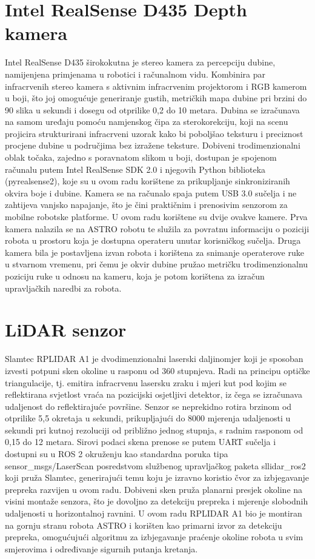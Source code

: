 \documentclass[12pt,a4paper,oneside]{report}
\begin{document}
\section{Intel RealSense D435 Depth kamera}
Intel RealSense D435 širokokutna je stereo kamera za percepciju dubine, namijenjena primjenama u robotici 
i računalnom vidu. Kombinira par infracrvenih stereo kamera s aktivnim infracrvenim projektorom i RGB kamerom 
u boji, što joj omogućuje generiranje gustih, metričkih mapa dubine pri brzini do 90 slika u sekundi i 
dosegu od otprilike 0,2 do 10 metara. Dubina se izračunava na samom uređaju pomoću namjenskog čipa za 
sterokorekciju, koji na scenu projicira strukturirani infracrveni uzorak kako bi poboljšao teksturu i 
preciznost procjene dubine u područjima bez izražene teksture. Dobiveni trodimenzionalni oblak točaka, 
zajedno s poravnatom slikom u boji, dostupan je spojenom računalu putem Intel RealSense SDK 2.0 i 
njegovih Python biblioteka (pyrealsense2), koje su u ovom radu korištene za prikupljanje sinkroniziranih 
okvira boje i dubine. Kamera se na računalo spaja putem USB 3.0 sučelja i ne zahtijeva vanjsko 
napajanje, što je čini praktičnim i prenosivim senzorom za mobilne robotske platforme. U ovom radu korištene su 
dvije ovakve kamere. Prva kamera nalazila se na ASTRO robotu te služila za povratnu informaciju o poziciji robota 
u prostoru koja je dostupna operateru unutar korisničkog sučelja. Druga kamera bila je postavljena izvan 
robota i korištena za snimanje operaterove ruke u stvarnom vremenu, pri čemu je okvir dubine pružao 
metričku trodimenzionalnu poziciju ruke u odnosu na kameru, koja je potom korištena za izračun upravljačkih 
naredbi za robota.

\section{LiDAR senzor}
Slamtec RPLIDAR A1 je dvodimenzionalni laserski daljinomjer koji je sposoban izvesti potpuni sken okoline u 
rasponu od 360 stupnjeva. Radi na principu optičke triangulacije, tj. emitira infracrvenu lasersku zraku i 
mjeri kut pod kojim se reflektirana svjetlost vraća na pozicijski osjetljivi detektor, iz čega se izračunava 
udaljenost do reflektirajuće površine. Senzor se neprekidno rotira brzinom od otprilike 5,5 okretaja u 
sekundi, prikupljajući do 8000 mjerenja udaljenosti u sekundi pri kutnoj rezoluciji od približno jednog 
stupnja, s radnim rasponom od 0,15 do 12 metara. Sirovi podaci skena prenose se putem UART sučelja i 
dostupni su u ROS 2 okruženju kao standardna poruka tipa 	sensor\_msgs/LaserScan posredstvom službenog 
upravljačkog paketa 	sllidar\_ros2 koji pruža Slamtec, generirajući temu koju je izravno koristio čvor za 
izbjegavanje prepreka razvijen u ovom radu. Dobiveni sken pruža planarni presjek okoline na visini montaže 
senzora, što je dovoljno za detekciju prepreka i mjerenje slobodnih udaljenosti u horizontalnoj ravnini. 
U ovom radu RPLIDAR A1 bio je montiran na gornju stranu robota ASTRO i korišten kao primarni izvor za 
detekciju prepreka, omogućujući algoritmu za izbjegavanje praćenje okoline robota u svim smjerovima i 
određivanje sigurnih putanja kretanja.
\end{document}
